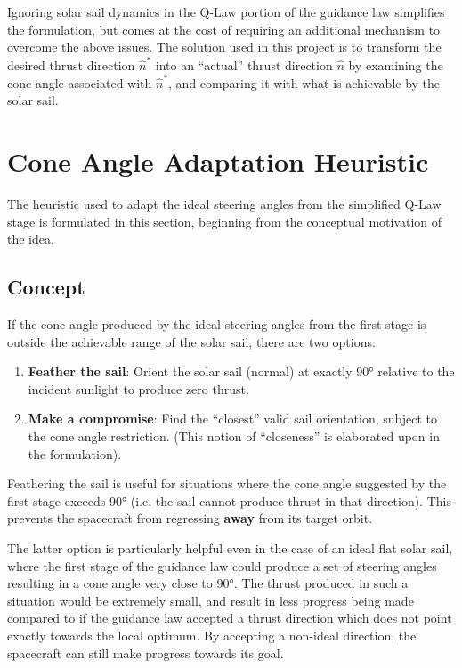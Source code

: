 Ignoring solar sail dynamics in the Q-Law portion of the guidance law simplifies the formulation, but comes at the cost of requiring an additional mechanism to overcome the above issues. The solution used in this project is to transform the desired thrust direction \(\hat{n}^*\) into an ``actual'' thrust direction \(\hat{n}\) by examining the cone angle associated with \(\hat{n}^*\), and comparing it with what is achievable by the solar sail.

\section{Cone Angle Adaptation Heuristic}
The heuristic used to adapt the ideal steering angles from the simplified Q-Law stage is formulated in this section, beginning from the conceptual motivation of the idea.

\subsection{Concept}
If the cone angle produced by the ideal steering angles from the first stage is outside the achievable range of the solar sail, there are two options:
\begin{enumerate}
  \setlength{\parskip}{2pt}
  \item \textbf{Feather the sail}: Orient the solar sail (normal) at exactly \ang{90} relative to the incident sunlight to produce zero thrust.
  \item \textbf{Make a compromise}: Find the ``closest'' valid sail orientation, subject to the cone angle restriction. (This notion of ``closeness'' is elaborated upon in the formulation).
\end{enumerate}

Feathering the sail is useful for situations where the cone angle suggested by the first stage exceeds \ang{90} (i.e. the sail cannot produce thrust in that direction). This prevents the spacecraft from regressing \textbf{away} from its target orbit.

The latter option is particularly helpful even in the case of an ideal flat solar sail, where the first stage of the guidance law could produce a set of steering angles resulting in a cone angle very close to \ang{90}. The thrust produced in such a situation would be extremely small, and result in less progress being made compared to if the guidance law accepted a thrust direction which does not point exactly towards the local optimum. By accepting a non-ideal direction, the spacecraft can still make progress towards its goal.

